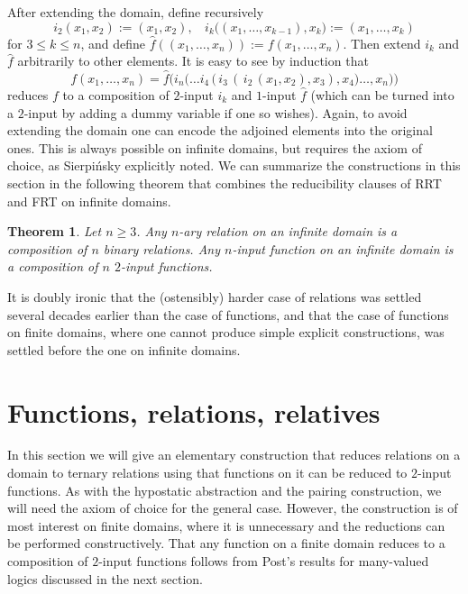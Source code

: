 \documentclass[11pt]{article}
\theoremstyle{plain}
\newtheorem{theorem}{Theorem}
\theoremstyle{definition}
\begin{document}
After extending the domain, define recursively 
$$
i_2(x_1,x_2):=(x_1,x_2),\ \ \ \ i_k\big((x_1,\dots, x_{k-1}),x_k\big):=(x_1,\dots,x_k)
$$ 
for $3\leq k\leq n$, and define $\widehat{f}((x_1,\dots,x_n)):=f(x_1,\dots,x_n)$. Then extend $i_k$ and $\widehat{f}$ arbitrarily to other elements. It is easy to see by induction that 
$$
f(x_1,\dots,x_n)=\widehat{f}\Big(i_n\big(\dots i_4\,\big(\,i_3\,(\,i_2\,(x_1,x_2),x_3),x_4\big)\dots, x_n\big)\Big)
$$ 
reduces $f$ to a composition of $2$-input $i_k$ and $1$-input $\widehat{f}$ (which can be turned into a $2$-input by adding a dummy variable if one so wishes). Again, to avoid extending the domain one can encode the adjoined elements into the original ones. This is always possible on infinite domains, but requires the axiom of choice, as Sierpi\'nsky explicitly noted. We can summarize the constructions in this section in the following theorem that combines the reducibility clauses of RRT and FRT on infinite domains.
\begin{theorem}\label{InfRed} Let $n\geq3$. Any $n$-ary relation  on an infinite domain is a composition of $n$ binary relations. Any $n$-input function on an infinite domain is a composition of $n$ $2$-input functions. 
\end{theorem}
It is doubly ironic that the (ostensibly) harder case of relations was settled several decades earlier than the case of functions, and that the case of functions on finite domains, where one cannot produce simple explicit constructions, was settled before the one on infinite domains.

\section{Functions, relations, relatives}\label{FunRel}

In this section we will give an elementary construction that reduces relations on a domain to ternary relations using that functions on it can be reduced to $2$-input functions. As with the hypostatic abstraction and the pairing construction, we will need the axiom of choice for the general case. However, the construction is of most interest on finite domains, where it is unnecessary and the reductions can be performed constructively. That any function on a finite domain reduces to a composition of $2$-input functions follows from Post's results for many-valued logics discussed in the next section.
\end{document}
